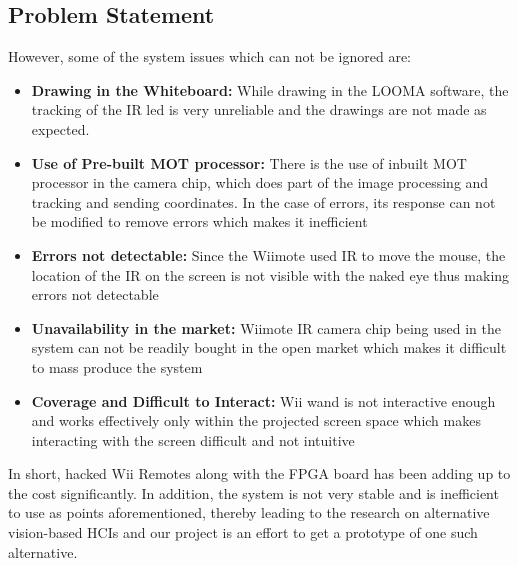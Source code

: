 \documentclass[12pt, a4paper]{article}
\begin{document}
\subsection{Problem Statement}
 However, some of the system issues which can not be ignored are:
\begin{itemize}
\item \textbf {Drawing in the Whiteboard:} While drawing in the LOOMA software, the tracking of the IR led is very unreliable and the drawings are not made as expected.
\item \textbf{Use of Pre-built MOT processor:} There is the use of inbuilt MOT processor in the camera chip, which does part of the image processing and tracking and sending coordinates. In the case of errors, its response can not be modified to remove errors which makes it inefficient
\item \textbf{Errors not detectable:} Since the Wiimote used IR to move the mouse, the location of the IR on the screen is not visible with the naked eye thus making errors not detectable 
\item \textbf{Unavailability in the market:} Wiimote IR camera chip being used in the system can not be readily bought in the open market which makes it difficult to mass produce the system
\item \textbf{Coverage and Difficult to Interact:} Wii wand is not interactive enough and works effectively only within the projected screen space which makes interacting with the screen difficult and not intuitive

\end{itemize}

In short, hacked Wii Remotes along with the FPGA board has been adding up to the cost significantly. In addition, the system is not very stable and is inefficient to use as points aforementioned, thereby leading to the research on alternative vision-based HCIs and our project is an effort to get a prototype of one such alternative.

\newpage
\end{document}

